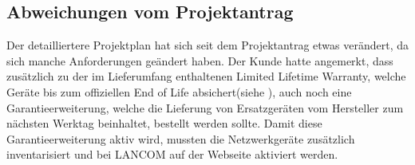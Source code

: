 \subsection{Abweichungen vom Projektantrag}
\label{sec:AbweichungenProjektantrag}
Der detailliertere Projektplan hat sich seit dem Projektantrag etwas verändert, da sich manche Anforderungen geändert haben. 
Der Kunde hatte angemerkt, dass zusätzlich zu der im Lieferumfang enthaltenen \glqq Limited Lifetime Warranty\grqq{}, welche Geräte bis zum offiziellen \glqq End of Life\grqq{} absichert(siehe \citet{LLW}), auch noch eine Garantieerweiterung, welche die Lieferung von Ersatzgeräten vom Hersteller zum nächsten Werktag beinhaltet, bestellt werden sollte. Damit diese Garantieerweiterung aktiv wird, mussten die Netzwerkgeräte zusätzlich inventarisiert und bei LANCOM auf der Webseite aktiviert werden.
\begin{comment}
	\item Sollte es Abweichungen zum Projektantrag geben (\zB Zeitplanung, Inhalt des Projekts, neue Anforderungen), müssen diese explizit aufgeführt und begründet werden.



\subsection{Ressourcenplanung}
\label{sec:Ressourcenplanung}

\begin{itemize}
	\item Detaillierte Planung der benötigten Ressourcen (Hard-/Software, Räumlichkeiten \usw).
	\item \Ggfs sind auch personelle Ressourcen einzuplanen (\zB unterstützende Mitarbeiter).
	\item Hinweis: Häufig werden hier Ressourcen vergessen, die als selbstverständlich angesehen werden (\zB PC, Büro). 
\end{itemize}


\subsection{Entwicklungsprozess}
\label{sec:Entwicklungsprozess}
\begin{itemize}
	\item Welcher Entwicklungsprozess wird bei der Bearbeitung des Projekts verfolgt (\zB Wasserfall, agiler Prozess)?
\end{itemize}
\end{comment}